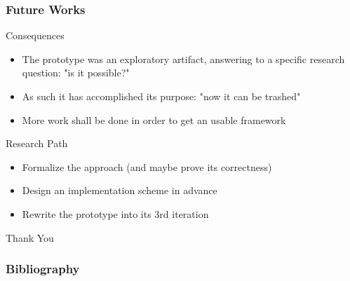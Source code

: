 \documentclass[dvipsnames, 10pt, table]{beamer}
\begin{document}
\begin{frame}
  \frametitle{Future Works}
  
  \begin{block}{Consequences}
    \begin{itemize}
      \item The prototype was an exploratory artifact, answering to a specific research question: "is it possible?"
      \item As such it has accomplished its purpose: "now it can be trashed"
      \item More work shall be done in order to get an usable framework
    \end{itemize}
  \end{block}

  \begin{exampleblock}{Research Path}
    \begin{itemize}
      \item Formalize the approach (and maybe prove its correctness)
      \item Design an implementation scheme in advance
      \item Rewrite the prototype into its 3rd iteration
    \end{itemize}
  \end{exampleblock}
\end{frame}

\begin{frame}
  \centering
  \Huge
  Thank You
\end{frame}

\begin{frame}
\frametitle{Bibliography}
\printbibliography
\nocite{*}
\end{frame}
\end{document}
